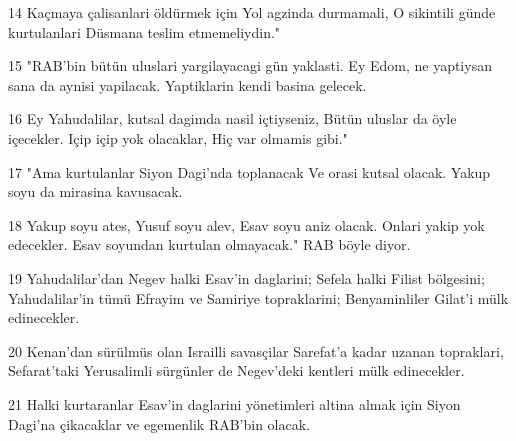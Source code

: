 \par 14 Kaçmaya çalisanlari öldürmek için Yol agzinda durmamali, O sikintili günde kurtulanlari Düsmana teslim etmemeliydin."
\par 15 "RAB'bin bütün uluslari yargilayacagi gün yaklasti. Ey Edom, ne yaptiysan sana da aynisi yapilacak. Yaptiklarin kendi basina gelecek.
\par 16 Ey Yahudalilar, kutsal dagimda nasil içtiyseniz, Bütün uluslar da öyle içecekler. Içip içip yok olacaklar, Hiç var olmamis gibi."
\par 17 "Ama kurtulanlar Siyon Dagi'nda toplanacak Ve orasi kutsal olacak. Yakup soyu da mirasina kavusacak.
\par 18 Yakup soyu ates, Yusuf soyu alev, Esav soyu aniz olacak. Onlari yakip yok edecekler. Esav soyundan kurtulan olmayacak." RAB böyle diyor.
\par 19 Yahudalilar'dan Negev halki Esav'in daglarini; Sefela halki Filist bölgesini; Yahudalilar'in tümü Efrayim ve Samiriye topraklarini; Benyaminliler Gilat'i mülk edinecekler.
\par 20 Kenan'dan sürülmüs olan Israilli savasçilar Sarefat'a kadar uzanan topraklari, Sefarat'taki Yerusalimli sürgünler de Negev'deki kentleri mülk edinecekler.
\par 21 Halki kurtaranlar Esav'in daglarini yönetimleri altina almak için Siyon Dagi'na çikacaklar ve egemenlik RAB'bin olacak.


